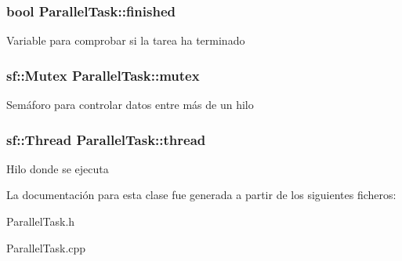 \subsubsection[{finished}]{\setlength{\rightskip}{0pt plus 5cm}bool Parallel\+Task\+::finished\hspace{0.3cm}{\ttfamily [protected]}}\label{classParallelTask_a924792685ebc2bd3bf8ec80e0dabe99f}
Variable para comprobar si la tarea ha terminado \hypertarget{classParallelTask_a39d71d5f6fd7fe3de25452c147028c91}{}
\subsubsection[{mutex}]{\setlength{\rightskip}{0pt plus 5cm}sf\+::\+Mutex Parallel\+Task\+::mutex\hspace{0.3cm}{\ttfamily [protected]}}\label{classParallelTask_a39d71d5f6fd7fe3de25452c147028c91}
Semáforo para controlar datos entre más de un hilo \hypertarget{classParallelTask_a8ad7af10ec7f3e7fa84998111d280e97}{}
\subsubsection[{thread}]{\setlength{\rightskip}{0pt plus 5cm}sf\+::\+Thread Parallel\+Task\+::thread\hspace{0.3cm}{\ttfamily [protected]}}\label{classParallelTask_a8ad7af10ec7f3e7fa84998111d280e97}
Hilo donde se ejecuta 

La documentación para esta clase fue generada a partir de los siguientes ficheros\+:\begin{DoxyCompactItemize}
\item 
Parallel\+Task.\+h\item 
Parallel\+Task.\+cpp\end{DoxyCompactItemize}
